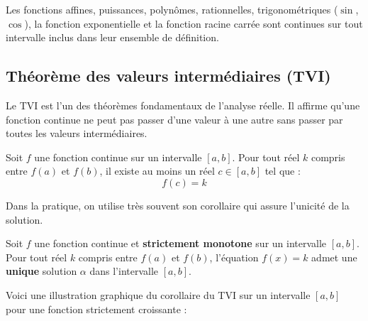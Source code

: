 \begin{propriete}
Les fonctions affines, puissances, polynômes, rationnelles, trigonométriques ($\sin$, $\cos$), la fonction exponentielle et la fonction racine carrée sont continues sur tout intervalle inclus dans leur ensemble de définition.
\end{propriete}

\subsection{Théorème des valeurs intermédiaires (TVI)}

Le TVI est l'un des théorèmes fondamentaux de l'analyse réelle. Il affirme qu'une fonction continue ne peut pas passer d'une valeur à une autre sans passer par toutes les valeurs intermédiaires.

\begin{theoreme}
Soit $f$ une fonction continue sur un intervalle $[a, b]$.
Pour tout réel $k$ compris entre $f(a)$ et $f(b)$, il existe au moins un réel $c \in [a, b]$ tel que :
\[
f(c) = k
\]
\end{theoreme}

Dans la pratique, on utilise très souvent son corollaire qui assure l'unicité de la solution.

\begin{theoreme}
Soit $f$ une fonction continue et \textbf{strictement monotone} sur un intervalle $[a, b]$.
Pour tout réel $k$ compris entre $f(a)$ et $f(b)$, l'équation $f(x) = k$ admet une \textbf{unique} solution $\alpha$ dans l'intervalle $[a, b]$.
\end{theoreme}

Voici une illustration graphique du corollaire du TVI sur un intervalle $[a,b]$ pour une fonction strictement croissante :


